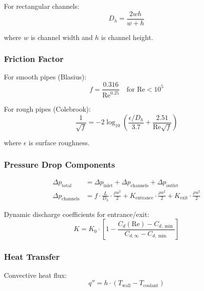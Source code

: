 \documentclass[12pt,a4paper]{article}
\begin{document}
For rectangular channels:
\begin{equation}
D_h = \frac{2wh}{w + h}
\end{equation}

where $w$ is channel width and $h$ is channel height.

\subsubsection{Friction Factor}

For smooth pipes (Blasius):
\begin{equation}
f = \frac{0.316}{\text{Re}^{0.25}} \quad \text{for Re} < 10^5
\end{equation}

For rough pipes (Colebrook):
\begin{equation}
\frac{1}{\sqrt{f}} = -2 \log_{10}\left(\frac{\epsilon/D_h}{3.7} + \frac{2.51}{\text{Re}\sqrt{f}}\right)
\end{equation}

where $\epsilon$ is surface roughness.

\subsubsection{Pressure Drop Components}

\begin{align}
\Delta p_{\text{total}} &= \Delta p_{\text{inlet}} + \Delta p_{\text{channels}} + \Delta p_{\text{outlet}} \\
\Delta p_{\text{channels}} &= f \cdot \frac{L}{D_h} \cdot \frac{\rho u^2}{2} + K_{\text{entrance}} \cdot \frac{\rho u^2}{2} + K_{\text{exit}} \cdot \frac{\rho u^2}{2}
\end{align}

Dynamic discharge coefficients for entrance/exit:
\begin{equation}
K = K_0 \cdot \left[1 - \frac{C_d(\text{Re}) - C_{d,\min}}{C_{d,\infty} - C_{d,\min}}\right]
\end{equation}

\subsubsection{Heat Transfer}

Convective heat flux:
\begin{equation}
q'' = h \cdot (T_{\text{wall}} - T_{\text{coolant}})
\end{equation}
\end{document}
